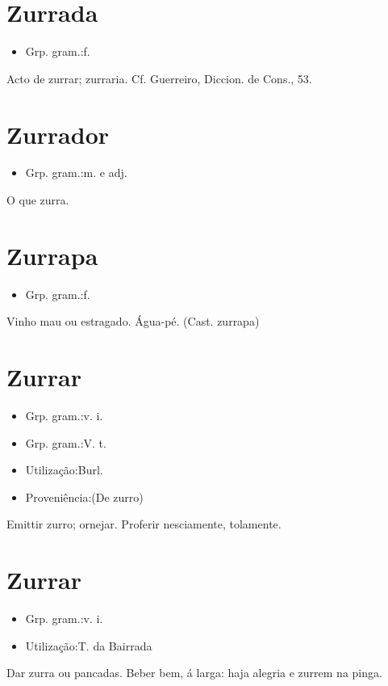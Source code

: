 \section{Zurrada}
\begin{itemize}
\item {Grp. gram.:f.}
\end{itemize}
Acto de zurrar; zurraria. Cf. Guerreiro, \textunderscore Diccion. de Cons.\textunderscore , 53.
\section{Zurrador}
\begin{itemize}
\item {Grp. gram.:m.  e  adj.}
\end{itemize}
O que zurra.
\section{Zurrapa}
\begin{itemize}
\item {Grp. gram.:f.}
\end{itemize}
Vinho mau ou estragado.
Água-pé.
(Cast. \textunderscore zurrapa\textunderscore )
\section{Zurrar}
\begin{itemize}
\item {Grp. gram.:v. i.}
\end{itemize}
\begin{itemize}
\item {Grp. gram.:V. t.}
\end{itemize}
\begin{itemize}
\item {Utilização:Burl.}
\end{itemize}
\begin{itemize}
\item {Proveniência:(De \textunderscore zurro\textunderscore )}
\end{itemize}
Emittir zurro; ornejar.
Proferir nesciamente, tolamente.
\section{Zurrar}
\begin{itemize}
\item {Grp. gram.:v. i.}
\end{itemize}
\begin{itemize}
\item {Utilização:T. da Bairrada}
\end{itemize}
Dar zurra ou pancadas.
Beber bem, á larga: \textunderscore haja alegria e zurrem na pinga\textunderscore .
